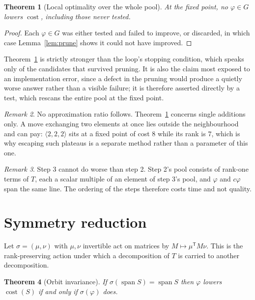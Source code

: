\documentclass[11pt,reqno]{amsart}
\theoremstyle{plain}
\newtheorem{theorem}{Theorem}[section]
\theoremstyle{definition}
\theoremstyle{remark}
\newtheorem{remark}[theorem]{Remark}
\newcommand{\spn}{\operatorname{span}}
\newcommand{\cost}{\operatorname{cost}}
\begin{document}
\begin{theorem}[Local optimality over the whole pool]\label{thm:oneopt}
At the fixed point, no $\varphi\in G$ lowers $\cost$, including those never
tested.
\end{theorem}

\begin{proof}
Each $\varphi\in G$ was either tested and failed to improve, or discarded, in
which case Lemma~\ref{lem:prune} shows it could not have improved.
\end{proof}

Theorem~\ref{thm:oneopt} is strictly stronger than the loop's stopping condition,
which speaks only of the candidates that survived pruning. It is also the claim
most exposed to an implementation error, since a defect in the pruning would
produce a quietly worse answer rather than a visible failure; it is therefore
asserted directly by a test, which rescans the entire pool at the fixed point.

\begin{remark}
No approximation ratio follows. Theorem~\ref{thm:oneopt} concerns single
additions only. A move exchanging two elements at once lies outside the
neighbourhood and can pay: $\langle 2,2,2\rangle$ sits at a fixed point of cost
$8$ while its rank is $7$, which is why escaping such plateaus is a separate
method rather than a parameter of this one.
\end{remark}

\begin{remark}
Step 3 cannot do worse than step 2. Step 2's pool consists of rank-one terms of
$T$, each a scalar multiple of an element of step 3's pool, and $\varphi$ and
$c\varphi$ span the same line. The ordering of the steps therefore costs time
and not quality.
\end{remark}

\section{Symmetry reduction}\label{sec:symmetry}

Let $\sigma=(\mu,\nu)$ with $\mu,\nu$ invertible act on matrices by
$M\mapsto \mu^{\mathsf T} M\nu$. This is the rank-preserving action under which
a decomposition of $T$ is carried to another decomposition.

\begin{theorem}[Orbit invariance]\label{thm:orbit}
If $\sigma(\spn S)=\spn S$ then $\varphi$ lowers $\cost(S)$ if and only if
$\sigma(\varphi)$ does.
\end{theorem}
\end{document}

